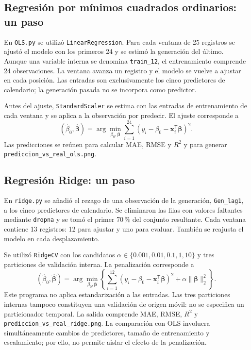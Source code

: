 \subsection{Regresión por mínimos cuadrados ordinarios: un paso}

En \texttt{OLS.py} se utilizó \texttt{LinearRegression}. Para cada ventana de 25 registros se ajustó el modelo con los primeros 24 y se estimó la generación del último. Aunque una variable interna se denomina \texttt{train\_12}, el entrenamiento comprende 24 observaciones. La ventana avanza un registro y el modelo se vuelve a ajustar en cada posición. Las entradas son exclusivamente los cinco predictores de calendario; la generación pasada no se incorpora como predictor.

Antes del ajuste, \texttt{StandardScaler} se estima con las entradas de entrenamiento de cada ventana y se aplica a la observación por predecir. El ajuste corresponde a
\begin{equation}
(\hat{\beta}_0,\hat{\boldsymbol{\beta}})
=\arg\min_{\beta_0,\boldsymbol{\beta}}
\sum_{i=1}^{24}
\left(y_i-\beta_0-\boldsymbol{x}_i^{\mathsf T}\boldsymbol{\beta}\right)^2.
\end{equation}
Las predicciones se reúnen para calcular MAE, RMSE y $R^2$ y para generar \texttt{prediccion\_vs\_real\_ols.png}.

\subsection{Regresión Ridge: un paso}

En \texttt{ridge.py} se añadió el rezago de una observación de la generación, \texttt{Gen\_lag1}, a los cinco predictores de calendario. Se eliminaron las filas con valores faltantes mediante \texttt{dropna} y se tomó el primer 70\,\% del conjunto resultante. Cada ventana contiene 13 registros: 12 para ajustar y uno para evaluar. También se reajusta el modelo en cada desplazamiento.

Se utilizó \texttt{RidgeCV} con los candidatos $\alpha\in\{0.001,0.01,0.1,1,10\}$ y tres particiones de validación interna. La penalización corresponde a
\begin{equation}
(\hat{\beta}_0,\hat{\boldsymbol{\beta}})
=\arg\min_{\beta_0,\boldsymbol{\beta}}
\left\{
\sum_{i=1}^{12}
\left(y_i-\beta_0-\boldsymbol{x}_i^{\mathsf T}\boldsymbol{\beta}\right)^2
+\alpha\|\boldsymbol{\beta}\|_2^2
\right\}.
\end{equation}
Este programa no aplica estandarización a las entradas. Las tres particiones internas tampoco constituyen una validación de origen móvil: no se especifica un particionador temporal. La salida comprende MAE, RMSE, $R^2$ y \texttt{prediccion\_vs\_real\_ridge.png}. La comparación con OLS involucra simultáneamente cambios de predictores, tamaño de entrenamiento y escalamiento; por ello, no permite aislar el efecto de la penalización.

